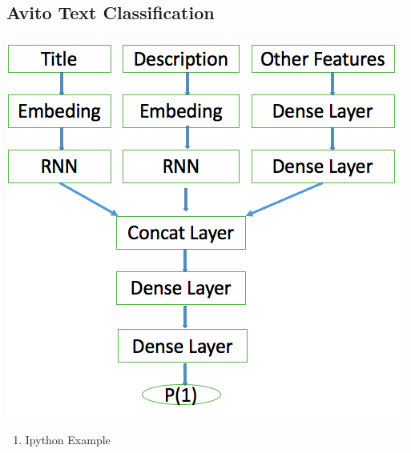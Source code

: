 \documentclass{beamer}
\begin{document}
	\subsection{Avito Text Classification}
	\begin{frame}
		\begin{center}
			\includegraphics[scale=0.45]{img/clf}
		\end{center}
		\vspace{-0.2cm}
		\begin{enumerate}
			\item Ipython Example
		\end{enumerate}
	\end{frame}
	
\end{document}
